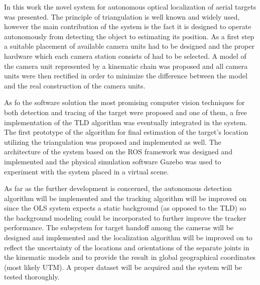 In this work the novel system for autonomous optical localization of aerial targets was presented. The principle of triangulation is well known and widely used, however the main contribution of the system is the fact it is designed to operate autonomously from detecting the object to estimating its position. As a first step a suitable placement of available camera units had to be designed and the proper hardware which each camera station consists of had to be selected. A model of the camera unit represented by a kinematic chain was proposed and all camera units were then rectified in order to minimize the difference between the model and the real construction of the camera units.

As fo the software solution the most promising computer vision techniques for both detection and tracing of the target were proposed and one of them, a free implementation of the TLD algorithm was eventually integrated in the system. The first prototype of the algorithm for final estimation of the target's location utilizing the triangulation was proposed and implemented as well. The architecture of the system based on the ROS framework was designed and implemented and the physical simulation software Gazebo was used to experiment with the system placed in a virtual scene.

As far as the further development is concerned, the autonomous detection algorithm will be implemented and the tracking algorithm will be improved on since the OLS system expects a static background (as opposed to the TLD) so the background modeling could be incorporated to further improve the tracker performance. The subsystem for target handoff among the cameras will be designed and implemented and the localization algorithm will be improved on to reflect the uncertainty of the locations and orientations of the separate joints in the kinematic models and to provide the result in global geographical coordinates (most likely UTM). A proper dataset will be acquired and the system will be tested thoroughly.